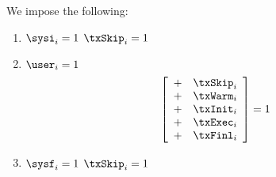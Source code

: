 We impose the following:
\begin{enumerate}
	\item \If $\sysi _{i} = 1$ \Then $\txSkip _{i} = 1$
	\item \If $\user _{i} = 1$ \Then
		\[
			\left[ \begin{array}{cr}
				+ & \txSkip _{i} \\
				+ & \txWarm _{i} \\
				+ & \txInit _{i} \\
				+ & \txExec _{i} \\
				+ & \txFinl _{i} \\
			\end{array} \right]
			= 1
		\]
	\item \If $\sysf _{i} = 1$ \Then $\txSkip _{i} = 1$
\end{enumerate}

